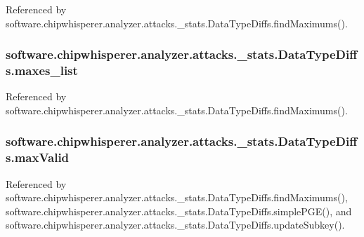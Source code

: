 Referenced by software.\+chipwhisperer.\+analyzer.\+attacks.\+\_\+stats.\+Data\+Type\+Diffs.\+find\+Maximums().

\hypertarget{classsoftware_1_1chipwhisperer_1_1analyzer_1_1attacks_1_1__stats_1_1DataTypeDiffs_a4c58ed365cfb852921ecbd178a90b422}{}
\subsubsection[{maxes\+\_\+list}]{\setlength{\rightskip}{0pt plus 5cm}software.\+chipwhisperer.\+analyzer.\+attacks.\+\_\+stats.\+Data\+Type\+Diffs.\+maxes\+\_\+list}\label{classsoftware_1_1chipwhisperer_1_1analyzer_1_1attacks_1_1__stats_1_1DataTypeDiffs_a4c58ed365cfb852921ecbd178a90b422}


Referenced by software.\+chipwhisperer.\+analyzer.\+attacks.\+\_\+stats.\+Data\+Type\+Diffs.\+find\+Maximums().

\hypertarget{classsoftware_1_1chipwhisperer_1_1analyzer_1_1attacks_1_1__stats_1_1DataTypeDiffs_a1000939d8fa01b2d59419318ecaca9dc}{}
\subsubsection[{max\+Valid}]{\setlength{\rightskip}{0pt plus 5cm}software.\+chipwhisperer.\+analyzer.\+attacks.\+\_\+stats.\+Data\+Type\+Diffs.\+max\+Valid}\label{classsoftware_1_1chipwhisperer_1_1analyzer_1_1attacks_1_1__stats_1_1DataTypeDiffs_a1000939d8fa01b2d59419318ecaca9dc}


Referenced by software.\+chipwhisperer.\+analyzer.\+attacks.\+\_\+stats.\+Data\+Type\+Diffs.\+find\+Maximums(), software.\+chipwhisperer.\+analyzer.\+attacks.\+\_\+stats.\+Data\+Type\+Diffs.\+simple\+P\+G\+E(), and software.\+chipwhisperer.\+analyzer.\+attacks.\+\_\+stats.\+Data\+Type\+Diffs.\+update\+Subkey().


